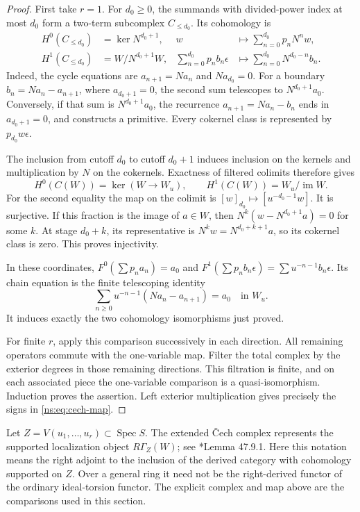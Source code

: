 \begin{proof}
First take \(r=1\).  For \(d_0\geq0\), the summands with
divided-power index at most \(d_0\) form a two-term subcomplex
\(C_{\leq d_0}\).  Its cohomology is
\begin{equation}\label{ns:eq:cutoff-cohomology}
 \begin{aligned}
 H^0(C_{\leq d_0})&=\ker N^{d_0+1},&
 w&\longmapsto\sum_{n=0}^{d_0}p_nN^nw,\\
 H^1(C_{\leq d_0})&=W/N^{d_0+1}W,&
 \sum_{n=0}^{d_0}p_nb_n\epsilon
   &\longmapsto\sum_{n=0}^{d_0}N^{d_0-n}b_n.
 \end{aligned}
\end{equation}
Indeed, the cycle equations are \(a_{n+1}=Na_n\) and
\(Na_{d_0}=0\).  For a boundary \(b_n=Na_n-a_{n+1}\), where
\(a_{d_0+1}=0\), the second sum telescopes to \(N^{d_0+1}a_0\).
Conversely, if that sum is \(N^{d_0+1}a_0\), the recurrence
\(a_{n+1}=Na_n-b_n\) ends in \(a_{d_0+1}=0\), and constructs
a primitive.  Every cokernel class is represented by \(p_{d_0}w\epsilon\).

The inclusion from cutoff \(d_0\) to cutoff \(d_0+1\) induces
inclusion on the kernels and multiplication by \(N\) on the
cokernels.  Exactness of filtered colimits therefore gives
\[
 H^0(C(W))=\ker(W\longrightarrow W_u),\qquad
 H^1(C(W))=W_u/\operatorname{im}W.
\]
For the second equality the map on the colimit is
\([w]_{d_0}\mapsto[u^{-d_0-1}w]\).  It is surjective.
If this fraction is the image of \(a\in W\), then
\(N^k(w-N^{d_0+1}a)=0\) for some \(k\).
At stage \(d_0+k\), its representative is
\(N^kw=N^{d_0+k+1}a\), so its cokernel class is zero.
This proves injectivity.

In these coordinates, \(F^0(\sum p_na_n)=a_0\) and
\(F^1(\sum p_nb_n\epsilon)=\sum u^{-n-1}b_n\epsilon\).
Its chain equation is the finite telescoping identity
\[
 \sum_{n\geq0}u^{-n-1}(Na_n-a_{n+1})=a_0
 \quad\text{in }W_u.
\]
It induces exactly the two cohomology isomorphisms just proved.

For finite \(r\), apply this comparison successively in each
direction.  All remaining operators commute with the one-variable
map.  Filter the total complex by the exterior degrees in those
remaining directions.  This filtration is finite, and on each
associated piece the one-variable comparison is a quasi-isomorphism.
Induction proves the assertion.  Left exterior multiplication gives
precisely the signs in \eqref{ns:eq:cech-map}.
\end{proof}

Let \(Z=V(u_1,\ldots,u_r)\subset\operatorname{Spec}S\).
The extended \v{C}ech complex represents the supported localization
object \(R\Gamma_Z(W)\); see \cite{stacks-supported}*{Lemma 47.9.1}.
Here this notation means the right adjoint to the inclusion of the
derived category with cohomology supported on \(Z\).
Over a general ring it need not be the right-derived functor of the
ordinary ideal-torsion functor.  The explicit complex and map above
are the comparisons used in this section.


